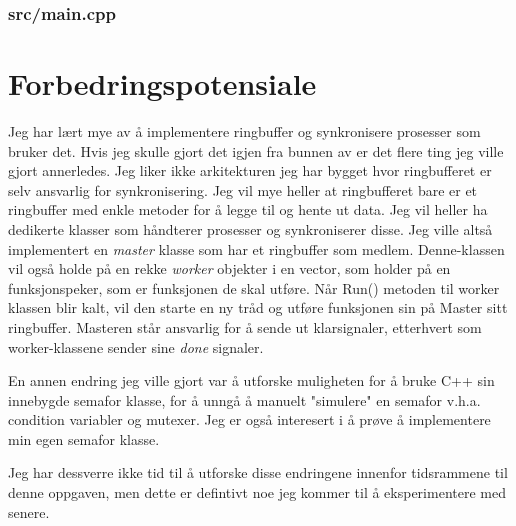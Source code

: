 \documentclass[a4paper, 12pt]{article}
\begin{document}
    \subsubsection{src/main.cpp}
    
    \restoregeometry

    \section{Forbedringspotensiale} \label{sec:forbedring}
    Jeg har lært mye av å implementere ringbuffer og synkronisere prosesser som bruker det. Hvis jeg skulle gjort det igjen fra bunnen av er det flere ting jeg ville gjort annerledes. Jeg liker ikke arkitekturen jeg har bygget hvor ringbufferet er selv ansvarlig for synkronisering. Jeg vil mye heller at ringbufferet bare er et ringbuffer med enkle metoder for å legge til og hente ut data. Jeg vil heller ha dedikerte klasser som håndterer prosesser og synkroniserer disse. Jeg ville altså implementert en \textit{master} klasse som har et ringbuffer som medlem. Denne-klassen vil også holde på en rekke \textit{worker} objekter i en vector, som holder på en funksjonspeker, som er funksjonen de skal utføre. Når Run() metoden til worker klassen blir kalt, vil den starte en ny tråd og utføre funksjonen sin på Master sitt ringbuffer. Masteren står ansvarlig for å sende ut klarsignaler, etterhvert som worker-klassene sender sine \textit{done} signaler.

    En annen endring jeg ville gjort var å utforske muligheten for å bruke C++ sin innebygde semafor klasse, for å unngå å manuelt "simulere" en semafor v.h.a. condition variabler og mutexer. Jeg er også interesert i å prøve å implementere min egen semafor klasse.

    Jeg har dessverre ikke tid til å utforske disse endringene innenfor tidsrammene til denne oppgaven, men dette er defintivt noe jeg kommer til å eksperimentere med senere.
    
\end{document}
